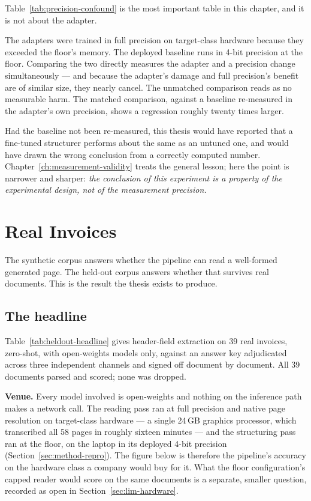 Table~\ref{tab:precision-confound} is the most important table in this chapter, and it is not
about the adapter.

The adapters were trained in full precision on target-class hardware because they exceeded the
floor's memory. The deployed baseline runs in 4-bit precision at the floor. Comparing the two
directly measures the adapter and a precision change simultaneously --- and because the
adapter's damage and full precision's benefit are of similar size, they nearly cancel. The
unmatched comparison reads as no measurable harm. The matched comparison, against a baseline
re-measured in the adapter's own precision, shows a regression roughly twenty times larger.



Had the baseline not been re-measured, this thesis would have reported that a fine-tuned
structurer performs about the same as an untuned one, and would have drawn the wrong conclusion
from a correctly computed number. Chapter~\ref{ch:measurement-validity} treats the general
lesson; here the point is narrower and sharper: \emph{the conclusion of this experiment is a
property of the experimental design, not of the measurement precision.}

\section{Real Invoices}
\label{sec:results-heldout}

The synthetic corpus answers whether the pipeline can read a well-formed generated page. The
held-out corpus answers whether that survives real documents. This is the result the thesis
exists to produce.

\subsection{The headline}

Table~\ref{tab:heldout-headline} gives header-field extraction on 39 real invoices, zero-shot,
with open-weights models only, against an answer key adjudicated across three independent
channels and signed off document by document. All 39 documents parsed and scored; none was
dropped.

\textbf{Venue.} Every model involved is open-weights and nothing on the inference path makes a
network call. The reading pass ran at full precision and native page resolution on
target-class hardware --- a single 24\,\ac{GB} graphics processor, which transcribed all
58 pages in roughly sixteen minutes --- and the structuring pass ran at the floor, on the
laptop in its deployed 4-bit precision (Section~\ref{sec:method-repro}). The figure below is
therefore the pipeline's accuracy on the hardware class a company would buy for it. What the
floor configuration's capped reader would score on the same documents is a separate, smaller
question, recorded as open in Section~\ref{sec:lim-hardware}.

